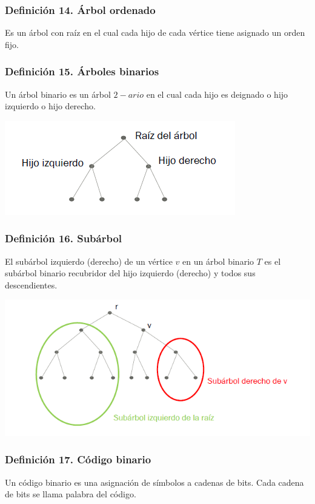 \documentclass{article}
\begin{document}
\subsubsection*{Definición 14. Árbol ordenado} 
Es un árbol con raíz en el cual cada hijo de cada vértice tiene asignado un orden fijo.

\subsubsection*{Definición 15. Árboles binarios} 
Un árbol binario es un árbol $2-ario$ en el cual cada hijo es deignado o hijo izquierdo o hijo derecho.
\begin{center}
    \includegraphics[width=.60\textwidth]{arbolBinario.PNG}
\end{center}

\subsubsection*{Definición 16. Subárbol}
El subárbol izquierdo (derecho) de un vértice $v$ en un árbol binario $T$ es el subárbol binario
recubridor del hijo izquierdo (derecho) y todos sus descendientes.
\begin{center}
    \includegraphics[width=.60\textwidth]{subarbol.PNG}
\end{center}

\subsubsection*{Definición 17. Código binario}
Un código binario es una asignación de símbolos a cadenas de bits. Cada cadena de bits se llama palabra del código.
\end{document}
